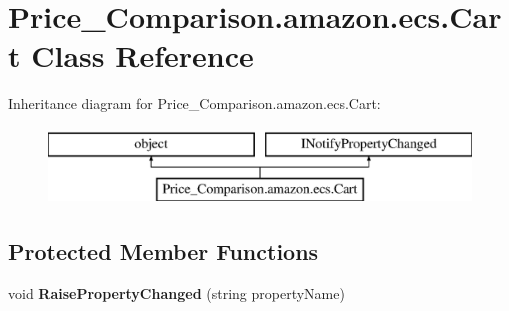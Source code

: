 \hypertarget{class_price___comparison_1_1amazon_1_1ecs_1_1_cart}{\section{Price\-\_\-\-Comparison.\-amazon.\-ecs.\-Cart Class Reference}
\label{class_price___comparison_1_1amazon_1_1ecs_1_1_cart}
}


 


Inheritance diagram for Price\-\_\-\-Comparison.\-amazon.\-ecs.\-Cart\-:\begin{figure}[H]
\begin{center}
\leavevmode
\includegraphics[height=2.000000cm]{class_price___comparison_1_1amazon_1_1ecs_1_1_cart}
\end{center}
\end{figure}
\subsection*{Protected Member Functions}
\begin{DoxyCompactItemize}
\item 
\hypertarget{class_price___comparison_1_1amazon_1_1ecs_1_1_cart_a39d8e8525e25d248ae86963b96790767}{void {\bfseries Raise\-Property\-Changed} (string property\-Name)}\label{class_price___comparison_1_1amazon_1_1ecs_1_1_cart_a39d8e8525e25d248ae86963b96790767}

\end{DoxyCompactItemize}
